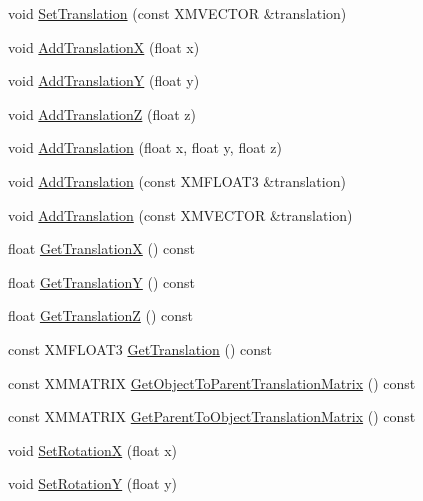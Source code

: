 \begin{DoxyCompactItemize}
\item 
void \hyperlink{classmage_1_1_transform_node_a0a6d54024fa758d7c4412e53e467b00c}{Set\+Translation} (const X\+M\+V\+E\+C\+T\+OR \&translation)
\item 
void \hyperlink{classmage_1_1_transform_node_a16f2077647c4a0f7f1f27e11ba7dbf37}{Add\+TranslationX} (float x)
\item 
void \hyperlink{classmage_1_1_transform_node_a84c2addddb05b0275a5d4150f343dd11}{Add\+TranslationY} (float y)
\item 
void \hyperlink{classmage_1_1_transform_node_a19aeee4f27b1af94d1626ae19dfe12b2}{Add\+TranslationZ} (float z)
\item 
void \hyperlink{classmage_1_1_transform_node_acd99ac8ba7379a3c8abcd02703aac4e3}{Add\+Translation} (float x, float y, float z)
\item 
void \hyperlink{classmage_1_1_transform_node_a2b9605c7e6db9f6a2805a1f5dfa9017f}{Add\+Translation} (const X\+M\+F\+L\+O\+A\+T3 \&translation)
\item 
void \hyperlink{classmage_1_1_transform_node_ae2f57eb9e02583900f865e80040279b4}{Add\+Translation} (const X\+M\+V\+E\+C\+T\+OR \&translation)
\item 
float \hyperlink{classmage_1_1_transform_node_a31b8818a43af8633136f345e30572723}{Get\+TranslationX} () const
\item 
float \hyperlink{classmage_1_1_transform_node_a0a4d107bb131f23f599ada568d10a330}{Get\+TranslationY} () const
\item 
float \hyperlink{classmage_1_1_transform_node_a0f7a78d289c16750e01ceefda0dea480}{Get\+TranslationZ} () const
\item 
const X\+M\+F\+L\+O\+A\+T3 \hyperlink{classmage_1_1_transform_node_a827c4ea5520141eb50866283acef95ad}{Get\+Translation} () const
\item 
const X\+M\+M\+A\+T\+R\+IX \hyperlink{classmage_1_1_transform_node_ad548d659067b5aa6bb0d76c073850179}{Get\+Object\+To\+Parent\+Translation\+Matrix} () const
\item 
const X\+M\+M\+A\+T\+R\+IX \hyperlink{classmage_1_1_transform_node_ae2d0f336a5567a585c15895da26ce0c6}{Get\+Parent\+To\+Object\+Translation\+Matrix} () const
\item 
void \hyperlink{classmage_1_1_transform_node_a7c67c5a3ce41a1a72e21a84aac5df688}{Set\+RotationX} (float x)
\item 
void \hyperlink{classmage_1_1_transform_node_a60188cf67c3d08f30c9d7c970351b8d3}{Set\+RotationY} (float y)
\item 

\end{DoxyCompactItemize}
